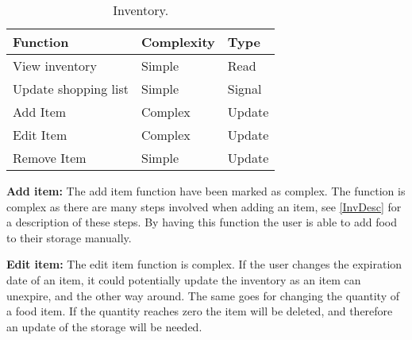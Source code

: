     \begin{table}[H]
	\centering
  \begin{tabular}{|l|l|l|}\hline
		\textbf{Function}&\textbf{Complexity}&\textbf{Type}\\\hline
	  View inventory        &  Simple  & Read   \\\hline
	  Update shopping list  &  Simple  & Signal \\\hline
	  Add Item              &  Complex & Update \\\hline
	  Edit Item             &  Complex & Update \\\hline
	  Remove Item           &  Simple  & Update \\\hline
  \end{tabular}
	\caption{Inventory.}
\end{table}

\textbf{Add item:} The add item function have been marked as complex. The function is complex as there are many steps involved when adding an item, see \cref{InvDesc} for a description of these steps. By having this function the user is able to add food to their storage manually.
    
\textbf{Edit item:} The edit item function is complex. If the user changes the expiration date of an item, it could potentially update the inventory as an item can unexpire, and the other way around. The same goes for changing the quantity of a food item. If the quantity reaches zero the item will be deleted, and therefore an update of the storage will be needed.
